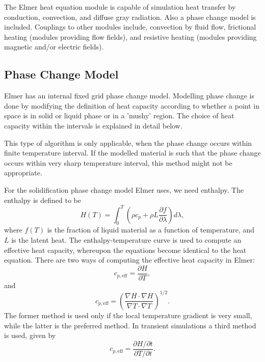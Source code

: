 \begin{versiona}
The Elmer heat equation module is capable of simulation heat transfer by
conduction, convection, and diffuse gray radiation. Also a phase change
model is included. Couplings to other modules include, convection by
fluid flow, frictional heating (modules providing flow fields), and
resistive heating (modules providing magnetic and/or electric fields).


\subsection{Phase Change Model}

Elmer has an internal fixed grid phase change model. Modelling phase change is done
by modifying the definition of heat capacity according to whether
a point in space is in solid or liquid phase or in a 'mushy' region.
The choice of heat capacity within the intervals is explained in detail
below.

This type of algorithm is only applicable, when the phase change occurs
within finite temperature interval. If the modelled material is such that
the phase change occurs within very sharp temperature interval, this
method might not be appropriate.

For the solidification phase change model Elmer uses,  we need enthalpy.
The enthalpy is defined to be
\begin{equation}
H(T) = \int_0^T \left ( \rho c_p + \rho L\frac{\partial f}{\partial \lambda}\right )d\lambda,
\end{equation}
where $f(T)$ is the fraction of liquid material as a function of
temperature, and $L$ is the latent heat.
The enthalpy-temperature curve is used
to compute an effective heat capacity, whereupon the equations become identical
to the heat equation. There are two ways of computing the effective heat capacity in Elmer:
\begin{equation}
c_{p,\mathrm{eff}} = \frac{\partial H}{\partial T},
\end{equation}
and
\begin{equation}
c_{p,\mathrm{eff}} = \left ( \frac{\nabla H\cdot\nabla H}{\nabla T\cdot\nabla T}\right )^{1/2}.
\end{equation}
The former method is used only if the local temperature gradient is very small, while
the latter is the preferred method. In transient simulations a third method is used, given
by
\begin{equation}
c_{p,\mathrm{eff}} = \frac{\partial H/\partial t}{\partial T/\partial t}.
\end{equation}


\end{versiona}
